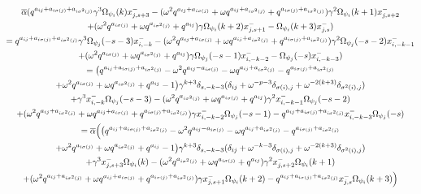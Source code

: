 \documentclass[12pt]{amsart}
\numberwithin{equation}{section}
\begin{document}
    \begin{multline*}
        \overline{\alpha}(q^{a_{ij} + a_{i\sigma(j)} + a_{i\sigma^2(j)}}\gamma^3\Omega_{\psi_i}(k)x_{j,s+3}^- - (\omega^2q^{a_{ij} + a_{i\sigma(j)}} + \omega q^{a_{ij} + a_{i\sigma^2(j)}} + q^{a_{i\sigma(j)} + a_{i\sigma^2(j)}})\gamma^2\Omega_{\psi_i}(k+1)x_{j,s+2}^- \\
        + (\omega^2q^{a_{i\sigma(j)}} + \omega q^{a_{i\sigma^2(j)}} + q^{a_{ij}})\gamma\Omega_{\psi_i}(k+2)x_{j,s+1}^- - \Omega_{\psi_i}(k+3)x_{j,s}^-)\\
        = q^{a_{ij} + a_{i\sigma(j)} + a_{i\sigma^2(j)}}\gamma^3\Omega_{\psi_j}(-s-3)x_{i,-k}^- - (\omega^2q^{a_{ij} + a_{i\sigma(j)}} + \omega q^{a_{ij} + a_{i\sigma^2(j)}} + q^{a_{i\sigma(j)} + a_{i\sigma^2(j)}})\gamma^2\Omega_{\psi_j}(-s-2)x_{i,-k-1}^-\\
        + (\omega^2q^{a_{i\sigma(j)}} + \omega q^{a_{i\sigma^2(j)}} + q^{a_{ij}})\gamma\Omega_{\psi_j}(-s-1)x_{i,-k-2}^- - \Omega_{\psi_j}(-s)x_{i,-k-3}^-)\\
        = \bigl(q^{a_{ij} + a_{i\sigma(j)} + a_{i\sigma^2(j)}} - \omega^2q^{a_{ij} - a_{i\sigma(j)}} - \omega q^{a_{ij} + a_{i\sigma^2(j)}} - q^{a_{i\sigma(j)} + a_{i\sigma^2(j)}}\\
   + \omega^2q^{a_{i\sigma(j)}} + \omega q^{a_{i\sigma^2(j)}} + q^{a_{ij}} - 1 \bigl)\gamma^{k+3}\delta_{s,-k-3}(\delta_{ij} + \omega^{-p-3}\delta_{\sigma(i),j} + \omega^{-2(k+3)}\delta_{\sigma^2(i),j})\\
   + \gamma^3 x_{i,-k}^-\Omega_{\psi_j}(-s-3) - (\omega^2q^{a_{i\sigma^2(j)}} + \omega q^{a_{i\sigma(j)}} + q^{a_{ij}})\gamma^2x_{i,-k-1}^-\Omega_{\psi_j}(-s-2)\\ 
    +  (\omega^2q^{a_{ij} + a_{i\sigma^2(j)}} + \omega q^{a_{ij} + a_{i\sigma(j)}} + q^{a_{i\sigma(j)} + a_{i\sigma^2(j)}})\gamma x_{i,-k-2}^-\Omega_{\psi_j}(-s-1) - q^{a_{ij} + a_{i\sigma(j)} + a_{i\sigma^2(j)}}x_{i,-k-3}^-\Omega_{\psi_j}(-s)\\
        =\overline{\alpha}\Bigl( \bigl(q^{a_{ij} + a_{i\sigma(j)} + a_{i\sigma^2(j)}} - \omega^2q^{a_{ij} - a_{i\sigma(j)}} - \omega q^{a_{ij} + a_{i\sigma^2(j)}} - q^{a_{i\sigma(j)} + a_{i\sigma^2(j)}} \\
        + \omega^2q^{a_{i\sigma(j)}} + \omega q^{a_{i\sigma^2(j)}} + q^{a_{ij}} - 1 \bigl)\gamma^{k+3}\delta_{s,-k-3}(\delta_{ij} + \omega^{-k-3}\delta_{\sigma(i),j} + \omega^{-2(k+3)}\delta_{\sigma^2(i),j})\\
        + \gamma^3 x_{j,s+3}^-\Omega_{\psi_i}(k) - (\omega^2q^{a_{i\sigma^2(j)}} + \omega q^{a_{i\sigma(j)}} + q^{a_{ij}})\gamma^2x_{j,s+2}^-\Omega_{\psi_i}(k+1)\\
         +  (\omega^2q^{a_{ij} + a_{i\sigma^2(j)}} + \omega q^{a_{ij} + a_{i\sigma(j)}} + q^{a_{i\sigma(j)} + a_{i\sigma^2(j)}})\gamma x_{j,s+1}^-\Omega_{\psi_i}(k+2) - q^{a_{ij} + a_{i\sigma(j)} + a_{i\sigma^2(j)}}x_{j,s}^-\Omega_{\psi_i}(k+3) \Bigl)
    \end{multline*}
\end{document}
